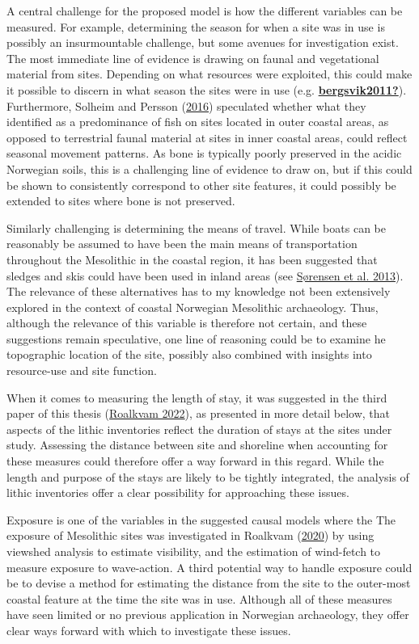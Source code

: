\documentclass[
  12pt,
  a4paper,
  oneside]{book}
\begin{document}
A central challenge for the proposed model is how the different variables can be measured. For example, determining the season for when a site was in use is possibly an insurmountable challenge, but some avenues for investigation exist. The most immediate line of evidence is drawing on faunal and vegetational material from sites. Depending on what resources were exploited, this could make it possible to discern in what season the sites were in use (e.g. \protect\hyperlink{ref-bergsvik2011}{\textbf{bergsvik2011?}}). Furthermore, Solheim and Persson (\protect\hyperlink{ref-solheim2016}{2016}) speculated whether what they identified as a predominance of fish on sites located in outer coastal areas, as opposed to terrestrial faunal material at sites in inner coastal areas, could reflect seasonal movement patterns. As bone is typically poorly preserved in the acidic Norwegian soils, this is a challenging line of evidence to draw on, but if this could be shown to consistently correspond to other site features, it could possibly be extended to sites where bone is not preserved.

Similarly challenging is determining the means of travel. While boats can be reasonably be assumed to have been the main means of transportation throughout the Mesolithic in the coastal region, it has been suggested that sledges and skis could have been used in inland areas (see \protect\hyperlink{ref-suxf8rensen2013}{Sørensen et al. 2013}). The relevance of these alternatives has to my knowledge not been extensively explored in the context of coastal Norwegian Mesolithic archaeology. Thus, although the relevance of this variable is therefore not certain, and these suggestions remain speculative, one line of reasoning could be to examine he topographic location of the site, possibly also combined with insights into resource-use and site function.

When it comes to measuring the length of stay, it was suggested in the third paper of this thesis (\protect\hyperlink{ref-roalkvam2022}{Roalkvam 2022}), as presented in more detail below, that aspects of the lithic inventories reflect the duration of stays at the sites under study. Assessing the distance between site and shoreline when accounting for these measures could therefore offer a way forward in this regard. While the length and purpose of the stays are likely to be tightly integrated, the analysis of lithic inventories offer a clear possibility for approaching these issues.

Exposure is one of the variables in the suggested causal models where the
The exposure of Mesolithic sites was investigated in Roalkvam (\protect\hyperlink{ref-roalkvam2020}{2020}) by using viewshed analysis to estimate visibility, and the estimation of wind-fetch to measure exposure to wave-action. A third potential way to handle exposure could be to devise a method for estimating the distance from the site to the outer-most coastal feature at the time the site was in use. Although all of these measures have seen limited or no previous application in Norwegian archaeology, they offer clear ways forward with which to investigate these issues.
\end{document}
